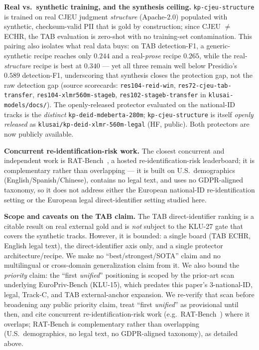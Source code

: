 \documentclass[11pt]{article}
\begin{document}
\textbf{Real vs.\ synthetic training, and the synthesis ceiling.} \texttt{kp-cjeu-structure} is
trained on real CJEU judgment \emph{structure} (Apache-2.0) populated with synthetic, checksum-valid
PII that is gold by construction; since CJEU $\neq$ ECHR, the TAB evaluation is zero-shot with no
training-set contamination. This pairing also isolates what real data buys: on TAB detection-F1, a
generic-synthetic recipe reaches only $0.244$ and a real-\emph{prose} recipe $0.265$, while the
real-\emph{structure} recipe is best at $0.340$ --- yet all three remain well below Presidio's
$0.589$ detection-F1, underscoring that synthesis closes the protection gap, not the raw detection
gap (source scorecards: \texttt{res104-reid-win}, \texttt{res72-cjeu-tab-transfer},
\texttt{res104-xlmr560m-stageb}, \texttt{res102-stageb-transfer} in \texttt{klusai-models/docs/}). The
openly-released protector evaluated on the national-ID tracks is the \emph{distinct}
\texttt{kp-deid-mdeberta-280m}; \texttt{kp-cjeu-structure} is itself \emph{openly released} as
\texttt{klusai/kp-deid-xlmr-560m-legal} (HF, public). Both protectors are now publicly available.

\textbf{Concurrent re-identification-risk work.} The closest concurrent and independent work is
RAT-Bench~\cite{ratbench2026}, a hosted re-identification-risk leaderboard; it is complementary
rather than overlapping --- it is built on U.S.\ demographics (English/Spanish/Chinese), contains no
legal text, and uses no GDPR-aligned taxonomy, so it does not address either the European national-ID
re-identification setting or the European legal direct-identifier setting studied here.

\textbf{Scope and caveats on the TAB claim.} The TAB direct-identifier ranking is a citable result on
real external gold and is \emph{not} subject to the KLU-27 gate that covers the synthetic tracks.
However, it is bounded: a single board (TAB ECHR, English legal text), the direct-identifier axis
only, and a single protector architecture/recipe. We make no ``best/strongest/SOTA'' claim and no
multilingual or cross-domain generalization claim from it. We also bound the \emph{priority} claim:
the ``first \emph{unified}'' positioning is scoped by the prior-art scan underlying EuroPriv-Bench
(KLU-15), which predates this paper's $3$-national-ID, legal, Track-C, and TAB external-anchor
expansion. We re-verify that scan before broadening any public priority claim, treat ``first
\emph{unified}'' as provisional until then, and cite concurrent re-identification-risk work
(e.g.\ RAT-Bench~\cite{ratbench2026}) where it overlaps; RAT-Bench is complementary rather than
overlapping (U.S.\ demographics, no legal text, no GDPR-aligned taxonomy), as detailed above.
\end{document}
